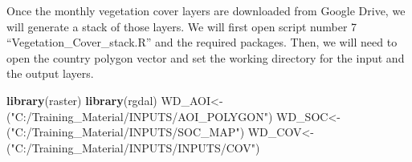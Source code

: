 \documentclass[
  10pt,
  b5paper,
]{book}
\newenvironment{Shaded}{\begin{snugshade}}{\end{snugshade}}
\newcommand{\KeywordTok}[1]{\textcolor[rgb]{0.13,0.29,0.53}{\textbf{#1}}}
\newcommand{\NormalTok}[1]{#1}
\newcommand{\StringTok}[1]{\textcolor[rgb]{0.31,0.60,0.02}{#1}}
\begin{document}
Once the monthly vegetation cover layers are downloaded from Google Drive, we will generate a stack of those layers. We will first open script number 7 ``Vegetation\_Cover\_stack.R'' and the required packages. Then, we will need to open the country polygon vector and set the working directory for the input and the output layers.

\begin{Shaded}
\begin{Highlighting}[]
\KeywordTok{library}\NormalTok{(raster)}
\KeywordTok{library}\NormalTok{(rgdal)}
\NormalTok{WD_AOI<-(}\StringTok{"C:/Training_Material/INPUTS/AOI_POLYGON"}\NormalTok{)}
\NormalTok{WD_SOC<-(}\StringTok{"C:/Training_Material/INPUTS/SOC_MAP"}\NormalTok{)}
\NormalTok{WD_COV<-(}\StringTok{"C:/Training_Material/INPUTS/INPUTS/COV"}\NormalTok{)}



\end{Highlighting}
\end{Shaded}
\end{document}
